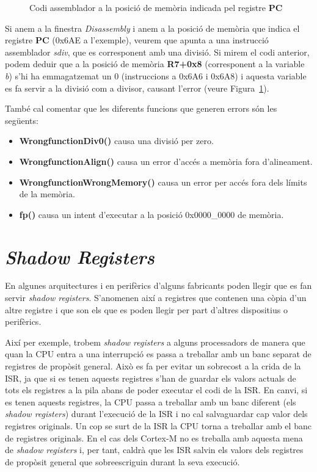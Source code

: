 \begin{figure}
 \centering
 \caption{Codi assemblador a la posició de memòria indicada pel registre {\bf PC}}
 \label{fig:HardFaultDis}
\end{figure}

Si anem a la finestra {\em Disassembly} i anem a la posició de memòria que indica el registre {\bf PC} (0x6AE a l'exemple), veurem que apunta a una instrucció assemblador {\em sdiv}, que es corresponent amb una divisió. Si mirem el codi anterior, podem deduir que a la posició de memòria {\bf R7+0x8} (corresponent a la variable {\em b}) s'hi ha emmagatzemat un 0 (instruccions a 0x6A6 i 0x6A8) i aquesta variable es fa servir a la divisió com a divisor, causant l'error (veure Figura~\ref{fig:HardFaultDis}).

També cal comentar que les diferents funcions que generen errors són les següents:
\begin{itemize}
 \item {\bf WrongfunctionDiv0()} causa una divisió per zero.
 \item {\bf WrongfunctionAlign()} causa un error d'accés a memòria fora d'alineament.
 \item {\bf WrongfunctionWrongMemory()} causa un error per accés fora dels límits de la memòria.
 \item {\bf fp()} causa un intent d'executar a la posició 0x0000\_0000 de memòria.
\end{itemize}

\chapter{{\em Shadow Registers}}
En algunes arquitectures i en perifèrics d'alguns fabricants poden llegir que es fan servir {\em shadow registers}. S'anomenen així a registres que contenen una còpia d'un altre registre i que son els que es poden llegir per part d'altres dispositius o perifèrics. 

Així per exemple, trobem {\em shadow registers} a alguns processadors de manera que quan la CPU entra a una interrupció es passa a treballar amb un banc separat de registres de propòsit general. Això es fa per evitar un sobrecost a la crida de la ISR, ja que si es tenen aquests registres s'han de guardar els valors actuals de tots els registres a la pila abans de poder executar el codi de la ISR. En canvi, si es tenen aquests registres, la CPU passa a treballar amb un banc diferent (els {\em shadow registers}) durant l'execució de la ISR i no cal salvaguardar cap valor dels registres originals. Un cop se surt de la ISR la CPU torna a treballar amb el banc de registres originals. En el cas dels Cortex-M no es treballa amb aquesta mena de {\em shadow registers} i, per tant, caldrà que les ISR salvin els valors dels registres de propòsit general que sobreescriguin durant la seva execució.


